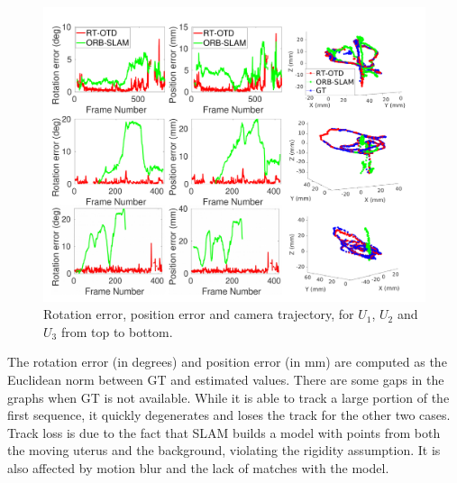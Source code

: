 \begin{figure}[!htbp]
  \centering
  \includegraphics[width=0.78\columnwidth]{./figs/Accuracy_errors.pdf}
\caption{Rotation error, position error and camera trajectory, for $U_1$, $U_2$ and $U_3$ from top to bottom.}
\label{fig:hister_results}
\end{figure}
The rotation error (in degrees) and position error (in mm) are computed as the Euclidean norm between GT and estimated values.
There are some gaps in the graphs when GT is not available.
While it is able to track a large portion of the first sequence, it quickly degenerates and loses the track for the other two cases.
Track loss is due to the fact that SLAM builds a model with points from both the moving uterus and the background, violating the rigidity assumption.
It is also affected by motion blur and the lack of matches with the model.


